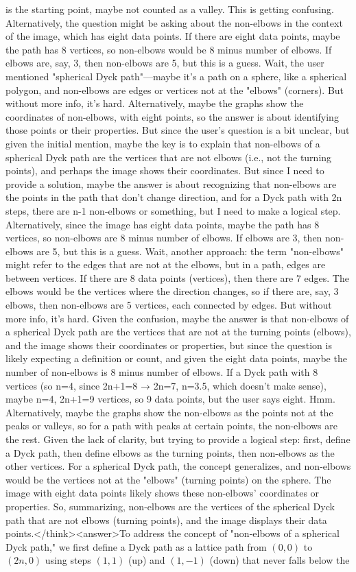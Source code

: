 is the starting point, maybe not counted as a valley. This is getting confusing. Alternatively, the question might be asking about the non-elbows in the context of the image, which has eight data points. If there are eight data points, maybe the path has 8 vertices, so non-elbows would be 8 minus number of elbows. If elbows are, say, 3, then non-elbows are 5, but this is a guess. Wait, the user mentioned "spherical Dyck path"—maybe it's a path on a sphere, like a spherical polygon, and non-elbows are edges or vertices not at the "elbows" (corners). But without more info, it's hard. Alternatively, maybe the graphs show the coordinates of non-elbows, with eight points, so the answer is about identifying those points or their properties. But since the user's question is a bit unclear, but given the initial mention, maybe the key is to explain that non-elbows of a spherical Dyck path are the vertices that are not elbows (i.e., not the turning points), and perhaps the image shows their coordinates. But since I need to provide a solution, maybe the answer is about recognizing that non-elbows are the points in the path that don't change direction, and for a Dyck path with 2n steps, there are n-1 non-elbows or something, but I need to make a logical step. Alternatively, since the image has eight data points, maybe the path has 8 vertices, so non-elbows are 8 minus number of elbows. If elbows are 3, then non-elbows are 5, but this is a guess. Wait, another approach: the term "non-elbows" might refer to the edges that are not at the elbows, but in a path, edges are between vertices. If there are 8 data points (vertices), then there are 7 edges. The elbows would be the vertices where the direction changes, so if there are, say, 3 elbows, then non-elbows are 5 vertices, each connected by edges. But without more info, it's hard. Given the confusion, maybe the answer is that non-elbows of a spherical Dyck path are the vertices that are not at the turning points (elbows), and the image shows their coordinates or properties, but since the question is likely expecting a definition or count, and given the eight data points, maybe the number of non-elbows is 8 minus number of elbows. If a Dyck path with 8 vertices (so n=4, since 2n+1=8 → 2n=7, n=3.5, which doesn't make sense), maybe n=4, 2n+1=9 vertices, so 9 data points, but the user says eight. Hmm. Alternatively, maybe the graphs show the non-elbows as the points not at the peaks or valleys, so for a path with peaks at certain points, the non-elbows are the rest. Given the lack of clarity, but trying to provide a logical step: first, define a Dyck path, then define elbows as the turning points, then non-elbows as the other vertices. For a spherical Dyck path, the concept generalizes, and non-elbows would be the vertices not at the "elbows" (turning points) on the sphere. The image with eight data points likely shows these non-elbows' coordinates or properties. So, summarizing, non-elbows are the vertices of the spherical Dyck path that are not elbows (turning points), and the image displays their data points.</think><answer>To address the concept of "non-elbows of a spherical Dyck path," we first define a Dyck path as a lattice path from \((0,0)\) to \((2n,0)\) using steps \((1,1)\) (up) and \((1,-1)\) (down) that never falls below the 